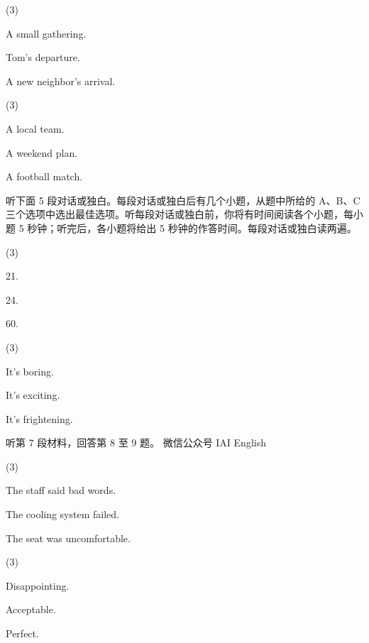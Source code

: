 \documentclass{英语试卷}
\begin{document}
\begin{choices}(3)
  \item A small gathering.
  \item Tom's departure.
  \item A new neighbor's arrival.
\end{choices}
\begin{choices}(3)
  \item A local team.
  \item A weekend plan.
  \item A football match.
\end{choices}
\par 听下面 5 段对话或独白。每段对话或独白后有几个小题，从题中所给的 A、B、C 三个选项中选出最佳选项。听每段对话或独白前，你将有时间阅读各个小题，每小题 5 秒钟；听完后，各小题将给出 5 秒钟的作答时间。每段对话或独白读两遍。\par
{}
\begin{choices}(3)
  \item 21.
  \item 24.
  \item 60.
\end{choices}
\begin{choices}(3)
  \item It's boring.
  \item It's exciting.
  \item It's frightening.
\end{choices}
\par 听第 7 段材料，回答第 8 至 9 题。 微信公众号 IAI English\par
{}
\begin{choices}(3)
  \item The staff said bad words.
  \item The cooling system failed.
  \item The seat was uncomfortable.
\end{choices}
\begin{choices}(3)
  \item Disappointing.
  \item Acceptable.
  \item Perfect.
\end{choices}
\end{document}
